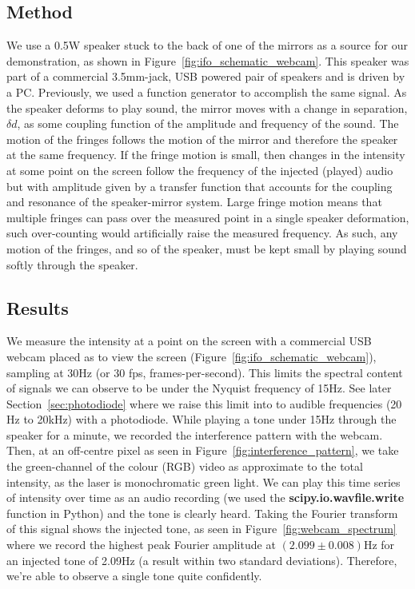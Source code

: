 \documentclass[prb,preprint]{revtex4-1}
\begin{document}
\subsection{Method}

We use a 0.5W speaker stuck to the back of one of the mirrors as a source for our demonstration, as shown in Figure~\ref{fig:ifo_schematic_webcam}. This speaker was part of a commercial 3.5mm-jack, USB powered pair of speakers and is driven by a PC. Previously, we used a function generator to accomplish the same signal.
As the speaker deforms to play sound, the mirror moves with a change in separation, $\delta d$, as some coupling function of the amplitude and frequency of the sound. The motion of the fringes follows the motion of the mirror and therefore the speaker at the same frequency.
If the fringe motion is small, then changes in the intensity at some point on the screen follow the frequency of the injected (played) audio but with amplitude given by a transfer function that accounts for the coupling and resonance of the speaker-mirror system.
Large fringe motion means that multiple fringes can pass over the measured point in a single speaker deformation, such over-counting would artificially raise the measured frequency. As such, any motion of the fringes, and so of the speaker, must be kept small by playing sound softly through the speaker.


\subsection{Results}

We measure the intensity at a point on the screen with a commercial USB webcam placed as to view the screen (Figure~\ref{fig:ifo_schematic_webcam}), sampling at 30Hz (or 30 fps, frames-per-second). This limits the spectral content of signals we can observe to be under the Nyquist frequency of 15Hz.
See later Section~\ref{sec:photodiode} where we raise this limit into to audible frequencies (20 Hz to 20kHz) with a photodiode.
While playing a tone under 15Hz through the speaker for a minute, we recorded the interference pattern with the webcam. Then, at an off-centre pixel as seen in Figure~\ref{fig:interference_pattern}, we take the green-channel of the colour (RGB) video as approximate to the total intensity, as the laser is monochromatic green light. We can play this time series of intensity over time as an audio recording (we used the \textbf{scipy.io.wavfile.write}\cite{scipy} function in Python\cite{python}) and the tone is clearly heard.
Taking the Fourier transform of this signal shows the injected tone, as seen in Figure~\ref{fig:webcam_spectrum} where we record the highest peak Fourier amplitude at $(2.099\pm 0.008)\mathrm{Hz}$ for an injected tone of 2.09Hz (a result within two standard deviations).
Therefore, we’re able to observe a single tone quite confidently.
\end{document}
